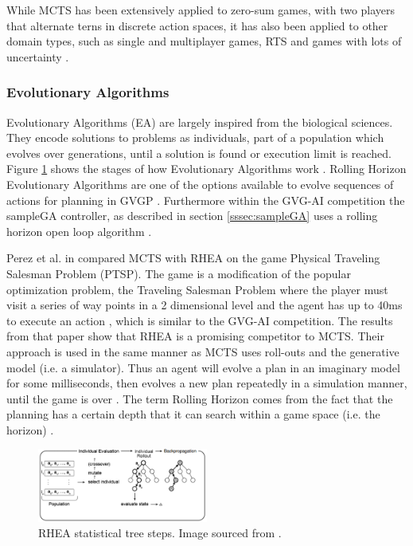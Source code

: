 \documentclass[journal]{IEEEtran}
\begin{document}
			While MCTS has been extensively applied to zero-sum games, with two players that alternate terns in discrete action spaces, it has also been applied to other domain types, such as single and multiplayer games, RTS and games with lots of uncertainty \cite{browne2012survey, de2016monte, frydenberg2015investigating}.

		


		\subsubsection{Evolutionary Algorithms} \label{sssec:EA}
			Evolutionary Algorithms (EA) are largely inspired from the biological sciences. They encode solutions to problems as individuals, part of a population which evolves over generations, until a solution is found or execution limit is reached. Figure \ref{fig:RHEArollout} shows the stages of how Evolutionary Algorithms work \cite{gaina2017rolling}.
			Rolling Horizon Evolutionary Algorithms are one of the options available to evolve sequences of actions for planning in GVGP \cite{perez2013rolling}. Furthermore within the GVG-AI competition the sampleGA controller, as described in section \ref{sssec:sampleGA} uses a rolling horizon open loop algorithm \cite{perez20162014}.

			Perez et al. in \cite{perez2013rolling} compared MCTS with RHEA on the game Physical Traveling Salesman Problem (PTSP). 
			The game is a modification of the popular optimization problem, the Traveling Salesman Problem \cite{perez2014solving, flood1956traveling} where the player must visit a series of way points in a 2 dimensional level and the agent has up to 40ms to execute an action \cite{perez2013rolling}, which is similar to the GVG-AI competition.  The results from that paper show that RHEA is a promising competitor to MCTS.
			Their approach is used in the same manner as MCTS uses roll-outs and the generative model (i.e. a simulator). Thus an agent will evolve a plan in an imaginary model for some milliseconds, then evolves a new plan repeatedly in a simulation manner, until the game is over \cite{perez2013rolling}.
			The term Rolling Horizon comes from the fact  that the planning has a certain depth that it can search within a game space  (i.e. the horizon) \cite{gaina2017analysis, gaina2017rolling}.
			
			
			\begin{figure}[h]
		   		 \centering
		   		 \includegraphics[width=0.5\textwidth]{RHEArollout}
		    		 \caption{RHEA statistical tree steps. Image sourced from \cite{gaina2017rolling}. }
		  		 \label{fig:RHEArollout}
			\end{figure}
			
\end{document}
